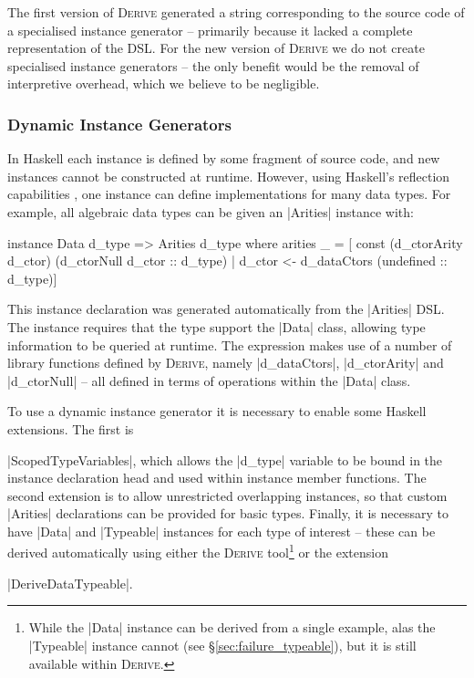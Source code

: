 \documentclass{llncs}
\newcommand{\derive}{\textsc{Derive}}
\begin{document}
The first version of \derive{} generated a string corresponding to the source code of a specialised instance generator -- primarily because it lacked a complete representation of the DSL. For the new version of \derive{} we do not create specialised instance generators -- the only benefit would be the removal of interpretive overhead, which we believe to be negligible.

\subsubsection{Dynamic Instance Generators}
\label{sec:dynamic_instances}

In Haskell each instance is defined by some fragment of source code, and new instances cannot be constructed at runtime. However, using Haskell's reflection capabilities \cite{lammel:syb2}, one instance can define implementations for many data types. For example, all algebraic data types can be given an |Arities| instance with:

\begin{code}
instance Data d_type => Arities d_type where
    arities _ =
        [  const (d_ctorArity d_ctor) (d_ctorNull d_ctor :: d_type)
        |  d_ctor <- d_dataCtors (undefined :: d_type)]
\end{code}

This instance declaration was generated automatically from the |Arities| DSL. The instance requires that the type support the |Data| class, allowing type information to be queried at runtime. The expression makes use of a number of library functions defined by \derive{}, namely |d_dataCtors|, |d_ctorArity| and |d_ctorNull| -- all defined in terms of operations within the |Data| class.

To use a dynamic instance generator it is necessary to enable some Haskell extensions. The first is \ignore|ScopedTypeVariables|, which allows the |d_type| variable to be bound in the instance declaration head and used within instance member functions. The second extension is to allow unrestricted overlapping instances, so that custom |Arities| declarations can be provided for basic types. Finally, it is necessary to have |Data| and |Typeable| instances for each type of interest -- these can be derived automatically using either the \derive{} tool\footnote{While the |Data| instance can be derived from a single example, alas the |Typeable| instance cannot (see \S\ref{sec:failure_typeable}), but it is still available within \derive{}.} or the extension \ignore|DeriveDataTypeable|.
\end{document}

